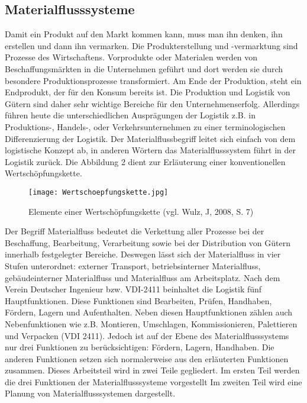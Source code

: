 \subsection{Materialflusssysteme}
Damit ein Produkt auf den Markt kommen kann, muss man ihn denken, ihn erstellen und dann ihn vermarken. Die Produkterstellung und -vermarktung sind Prozesse des Wirtschaftens. Vorprodukte oder Materialen werden von Beschaffungsm\"arkten in die Unternehmen gef\"uhrt und dort werden sie durch besondere Produktionsprozesse transformiert. Am Ende der Produktion, steht ein Endprodukt, der f\"ur den Konsum bereits ist. 
Die Produktion und Logistik von G\"utern sind daher sehr wichtige Bereiche f\"ur den Unternehmenserfolg. Allerdings f\"uhren heute die unterschiedlichen Auspr\"agungen der Logistik z.B. in Produktions-, Handels-, oder Verkehrsunternehmen zu einer terminologischen Differenzierung der Logistik. Der Materialflussbegriff leitet sich einfach von dem logistische Konzept ab, in anderen W\"ortern das Materialflusssystem f\"uhrt in der Logistik zur\"uck. Die Abbildung 2 dient zur Erl\"auterung einer konventionellen Wertsch\"opfungskette. 
	\begin{figure}[h!]
		\centering
		\texttt{[image: Wertschoepfungskette.jpg]}
	\caption{Elemente einer Wertsch\"opfungskette (vgl. Wulz, J, 2008, S. 7)}
	\label{Wertschoepfungskette}
\end{figure}

Der Begriff Materialfluss bedeutet die Verkettung aller Prozesse bei der Beschaffung, Bearbeitung, Verarbeitung sowie bei der Distribution von G\"utern innerhalb festgelegter Bereiche. Deswegen l\"asst sich der Materialfluss in vier Stufen unterordnet: externer Transport, betriebsinterner Materialfluss, geb\"audeinterner Materialfluss und Materialfluss am Arbeitsplatz. Nach dem Verein Deutscher Ingenieur bzw. VDI-2411 beinhaltet die Logistik f\"unf Hauptfunktionen. Diese Funktionen sind Bearbeiten, Pr\"ufen, Handhaben, F\"ordern, Lagern und Aufenthalten. Neben diesen Hauptfunktionen z\"ahlen auch Nebenfunktionen wie z.B. Montieren, Umschlagen, Kommissionieren, Palettieren und Verpacken (VDI 2411). Jedoch ist auf der Ebene des Materialflusssystems nur drei Funktionen zu ber\"ucksichtigen: F\"ordern, Lagern, Handhaben. Die anderen Funktionen setzen sich normalerweise aus den erl\"auterten Funktionen zusammen. Dieses Arbeitsteil wird in zwei Teile gegliedert. Im ersten Teil werden die drei Funktionen der Materialflusssysteme vorgestellt Im zweiten Teil wird eine Planung von Materialflusssystemen dargestellt.

